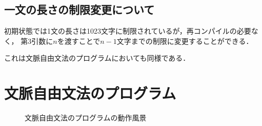 \documentclass[uplatex, dvipdfmx, a4paper, twocolumn]{jsarticle}
\begin{document}
    \subsection{一文の長さの制限変更について}
    初期状態では1文の長さは1023文字に制限されているが，再コンパイルの必要なく，
    第3引数に$n$を渡すことで\(n - 1\)文字までの制限に変更することができる．

    これは文脈自由文法のプログラムにおいても同様である．

  \clearpage
  \section{文脈自由文法のプログラム}
  
  
  
  
  
  
  
  
  
  \begin{figure}[htpb]
    \centering
    \caption{文脈自由文法のプログラムの動作風景}
    \label{fig:network}
  \end{figure}
\end{document}
